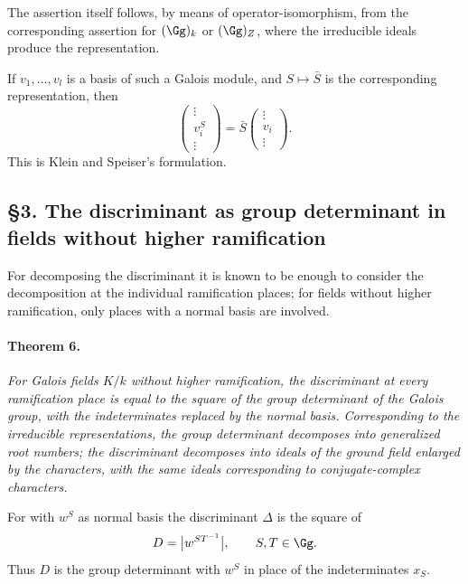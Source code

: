 The assertion itself follows, by means of operator-isomorphism, from the corresponding assertion for \((\Gg)_k\) or \((\Gg)_Z\), where the irreducible ideals produce the representation.

If \(v_1,
\ldots,v_l\) is a basis of such a Galois module, and \(S\mapsto\bar S\) is the corresponding representation, then
\[
        \begin{pmatrix}\vdots\\ v_i^S\\ \vdots\end{pmatrix}
        =\bar S\begin{pmatrix}\vdots\\ v_i\\ \vdots\end{pmatrix}.
\]
This is Klein and Speiser's formulation.

\subsection*{§3. The discriminant as group determinant in fields without higher ramification}

For decomposing the discriminant it is known to be enough to consider the decomposition at the individual ramification places; for fields without higher ramification, only places with a normal basis are involved.

\paragraph{Theorem 6.}
\emph{For Galois fields \(K/k\) without higher ramification, the discriminant at every ramification place is equal to the square of the group determinant of the Galois group, with the indeterminates replaced by the normal basis. Corresponding to the irreducible representations, the group determinant decomposes into generalized root numbers; the discriminant decomposes into ideals of the ground field enlarged by the characters, with the same ideals corresponding to conjugate-complex characters.}

For with \(w^S\) as normal basis the discriminant \(\Delta\) is the square of
\[
        D=\bigl|w^{ST^{-1}}\bigr|,
        \qquad S,T\in\Gg.
\]
Thus \(D\) is the group determinant with \(w^S\) in place of the indeterminates \(x_S\).

